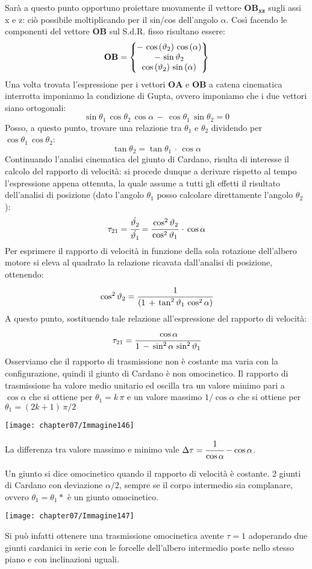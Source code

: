 Sarà a questo punto opportuno proiettare nuovamente il vettore $\mathbf{OB_{xz}}$ sugli assi x e z: ciò possibile moltiplicando per il sin/cos dell'angolo $\alpha$. Così facendo le componenti del vettore $\mathbf{OB}$ sul S.d.R. fisso risultano essere:
\[\mathbf{OB} = \B{-\,\cos{(\theta_2)}\,\cos{(\alpha)}\\-\,\sin{\theta_2}\\\cos{(\theta_2)}\,\sin{(\alpha)}}\]
Una volta trovata l'espressione per i vettori $\mathbf{OA}$ e $\mathbf{OB}$ a catena cinematica interrotta imponiamo la condizione di Gupta, ovvero imponiamo che i due vettori siano ortogonali:
\[\sin{\theta_1}\,\cos{\theta_2}\,\cos{\alpha}\,-\,\cos{\theta_1}\,\sin{\theta_2} = 0\]
Posso, a questo punto, trovare una relazione tra $\theta_1$ e $\theta_2$ dividendo per $\cos{\theta_1}\,\cos{\theta_2}$:
\[\tan{\theta_2} = \tan{\theta_1}\,\cdot\,\cos{\alpha}\]
Continuando l'analisi cinematica del giunto di Cardano, risulta di interesse il calcolo del rapporto di velocità: si procede dunque a derivare rispetto al tempo l'espressione appena ottenuta, la quale assume a tutti gli effetti il risultato dell'analisi di posizione (dato l'angolo $\theta_1$ posso calcolare direttamente l'angolo $\theta_2$):
\[\tau_{21} = \cfrac{\dot{\theta_2}}{\dot{\theta_1}} = \cfrac{\cos^2{\theta_2}}{\cos^2{\theta_1}}\,\cdot\,\cos{\alpha}\]
Per esprimere il rapporto di velocità in funzione della sola rotazione dell'albero motore si eleva al quadrato la relazione ricavata dall'analisi di posizione, ottenendo:
\[\cos^2{\theta_2} = \cfrac{1}{(1\,+\,\tan^2{\theta_1}\,\cos^2{\alpha})}\]
A questo punto, sostituendo tale relazione all'espressione del rapporto di velocità:
\[\tau_{21} = \cfrac{\cos{\alpha}}{1\,-\,\sin^2{\alpha}\,\sin^2{\theta_1}}\]
Osserviamo che il rapporto di trasmissione non è costante ma varia con la configurazione, quindi il giunto di Cardano è non omocinetico. Il rapporto di trasmissione ha valore medio unitario ed oscilla tra un valore minimo pari a $\cos{\alpha}$ che si ottiene per $\theta_1 = k\,\pi$ e un valore massimo $1/\cos{\alpha}$ che si ottiene per $\theta_1 = (2k+1)\,\pi/2$

\begin{center}
\texttt{[image: chapter07/Immagine146]}
\end{center}

La differenza tra valore massimo e minimo vale $\Delta \tau = \cfrac{1}{\cos{\alpha}} - \cos{\alpha}$.

Un giunto si dice omocinetico quando il rapporto di velocità è costante. 2 giunti di Cardano con deviazione $\alpha /2$, sempre se il corpo intermedio sia complanare, ovvero $\theta_1 = \theta_1*$ è un giunto omocinetico.
\begin{center}
\texttt{[image: chapter07/Immagine147]}
\end{center}
Si può infatti ottenere una trasmissione omocinetica avente $\tau = 1$ adoperando due giunti cardanici in serie con le forcelle dell'albero intermedio poste nello stesso piano e con inclinazioni uguali.

